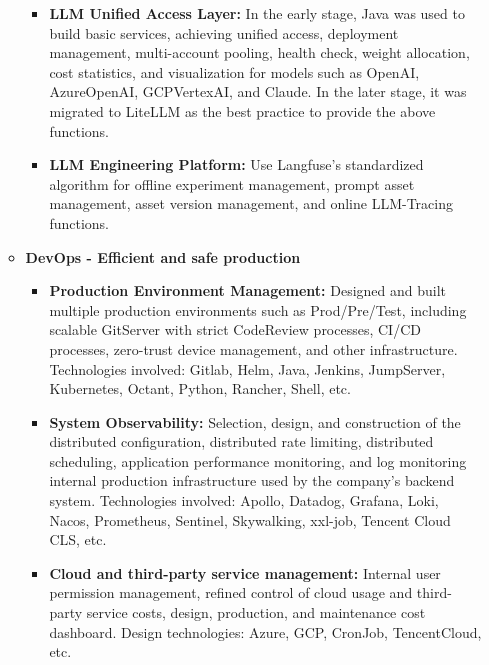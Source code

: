 \documentclass[letterpaper,11pt]{article}
\begin{document}
\begin{spacing}{0.9}
\begin{itemize}
\begin{itemize}
\begin{itemize}
				\item \textbf{LLM Unified Access Layer: }In the early stage, Java was used to build basic services, achieving unified access, deployment management, multi-account pooling, health check, weight allocation, cost statistics, and visualization for models such as OpenAI, AzureOpenAI, GCPVertexAI, and Claude. In the later stage, it was migrated to LiteLLM as the best practice to provide the above functions.
				\item \textbf{LLM Engineering Platform: }Use Langfuse's standardized algorithm for offline experiment management, prompt asset management, asset version management, and online LLM-Tracing functions.
			\end{itemize}
			
			\item \textbf{DevOps - Efficient and safe production}
			\begin{itemize}
				\item \textbf{Production Environment Management: }Designed and built multiple production environments such as Prod/Pre/Test, including scalable GitServer with strict CodeReview processes, CI/CD processes, zero-trust device management, and other infrastructure. Technologies involved: Gitlab, Helm, Java, Jenkins, JumpServer, Kubernetes, Octant, Python, Rancher, Shell, etc.
				\item \textbf{System Observability: }Selection, design, and construction of the distributed configuration, distributed rate limiting, distributed scheduling, application performance monitoring, and log monitoring internal production infrastructure used by the company's backend system. Technologies involved: Apollo, Datadog, Grafana, Loki, Nacos, Prometheus, Sentinel, Skywalking, xxl-job, Tencent Cloud CLS, etc.
				\item \textbf{Cloud and third-party service management: }Internal user permission management, refined control of cloud usage and third-party service costs, design, production, and maintenance cost dashboard. Design technologies: Azure, GCP, CronJob, TencentCloud, etc.
			\end{itemize}
			

\end{itemize}
\end{itemize}
\end{spacing}
\end{document}
